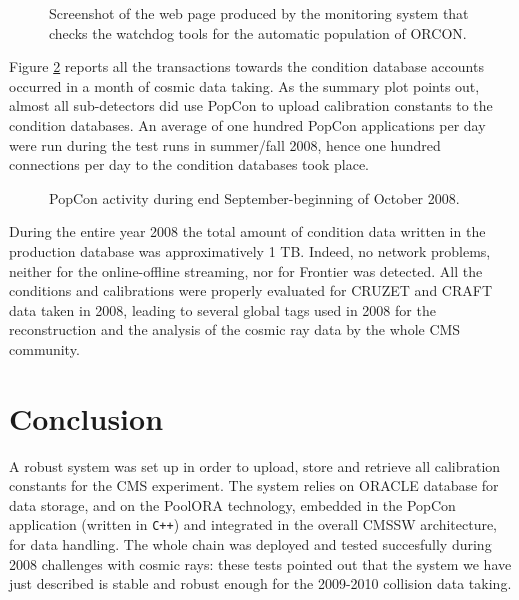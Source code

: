 \documentclass[a4paper]{jpconf}
\begin{document}
\begin{figure}[hbtp]
  \begin{center}
     \caption{Screenshot of the web page produced by the monitoring system that checks the watchdog tools for the automatic population of ORCON.}
    \label{fig:WatchDog}
  \end{center}
\end{figure}

Figure \ref{fig:PopConAct} reports all the transactions towards the condition database accounts occurred in a month of cosmic data taking. 
As the summary plot points out, almost all sub-detectors did use PopCon to upload calibration constants to the condition databases.
An average of one hundred PopCon applications per day were run during the test runs in summer/fall 2008, hence one hundred connections per day to the condition databases took place.

\begin{figure}[hbtp]
  \begin{center}
     \caption{PopCon activity during end September-beginning of October 2008.}
    \label{fig:PopConAct}
  \end{center}
\end{figure}

During the entire year 2008 the total amount of condition data written in the production database was approximatively 1 TB. 
Indeed, no network problems, neither for the online-offline streaming, nor for Frontier was detected. 
All the conditions and calibrations were properly evaluated for CRUZET and CRAFT data taken in 2008, leading to several global tags used in 2008 for the reconstruction and the analysis of the cosmic ray data by the whole CMS community. 

\newpage

\section{Conclusion}

A robust system was set up in order to upload, store and retrieve all calibration constants for the CMS experiment. 
The system relies on ORACLE database for data storage, and on the PoolORA technology, embedded in the PopCon application (written in \texttt{C++}) and integrated in the overall CMSSW architecture, for data handling. 
The whole chain was deployed and tested succesfully during 2008 challenges with cosmic rays: these tests pointed out that the system we have just described is stable and robust enough for the 2009-2010 collision data taking.
\end{document}
